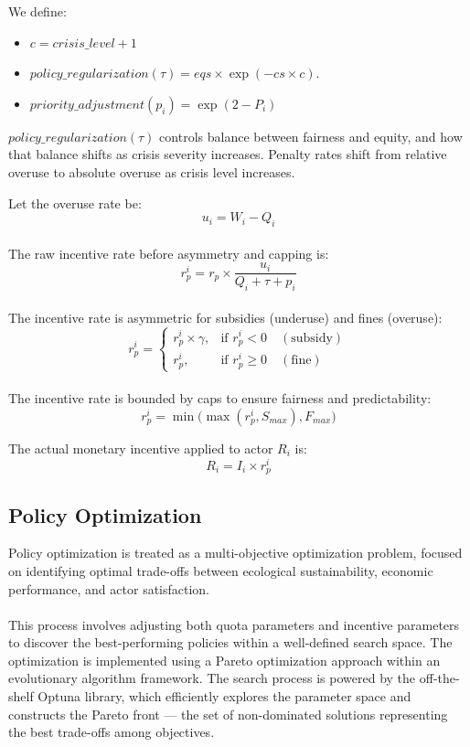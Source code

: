 \documentclass[ruler]{CUP-JNL-EDS}%
\begin{document}
\noindent We define:
\begin{itemize}
    \item $c = crisis\_level + 1$
    \item $policy\_regularization(\tau) = eqs \times \exp(-cs \times c)$.
    \item $priority\_adjustment (p_i) = \exp(2 - P_i)$
\end{itemize} 
$policy\_regularization(\tau)$ controls balance between fairness and equity, and how that balance shifts as crisis severity increases.
Penalty rates shift from relative overuse to absolute overuse as crisis level increases. 

\noindent Let the overuse rate be:
\[
    u_i = W_i - Q_i
\]
\\
\noindent The raw incentive rate before asymmetry and capping is:
\[
r_p^{i} = r_p \times \frac{u_i}{Q_i +  \tau + p_i}
\]
\\
\noindent The incentive rate is asymmetric for subsidies (underuse) and fines (overuse):
\[
r_p^{i} =
\begin{cases}
r_p^{i} \times \gamma, & \text{if } r_p^{i} < 0 \quad (\text{subsidy}) \\
r_p^{i}, & \text{if } r_p^{i} \geq 0 \quad (\text{fine})
\end{cases}
\]
\\
\noindent The incentive rate is bounded by caps to ensure fairness and predictability:
\[
r_p^{i} = \min\big(\max(r_p^{i}, S_{max}), F_{max}\big)
\]

\noindent The actual monetary incentive applied to actor $R_i$ is:
\[
R_i = I_i \times r_p^{i}
\]

\subsection{Policy Optimization}
Policy optimization is treated as a multi-objective optimization problem, focused on identifying optimal trade-offs 
between ecological sustainability, economic performance, and actor satisfaction. 
\\ \\ 
This process involves adjusting both quota parameters and incentive parameters to discover the best-performing policies 
within a well-defined search space. The optimization is implemented using a Pareto optimization approach within an 
evolutionary algorithm framework. The search process is powered by the off-the-shelf Optuna library, which efficiently 
explores the parameter space and constructs the Pareto front — the set of non-dominated solutions representing the best 
trade-offs among objectives.
\end{document}
